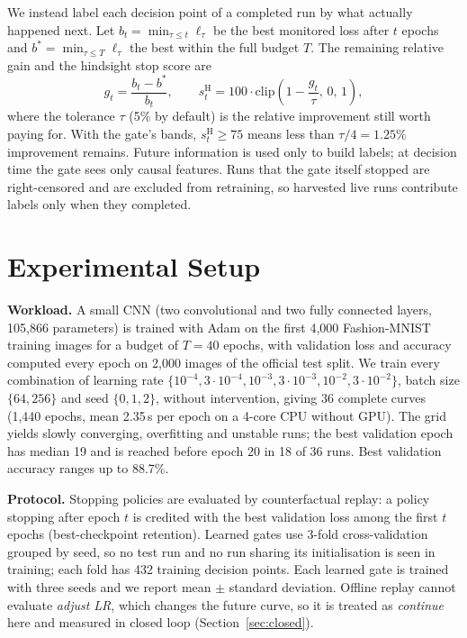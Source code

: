 \documentclass[conference]{IEEEtran}
\begin{document}
We instead label each decision point of a completed run by what actually happened next. Let $b_t=\min_{\tau\le t}\ell_\tau$ be the best monitored loss after $t$ epochs and $b^\ast=\min_{\tau\le T}\ell_\tau$ the best within the full budget $T$. The remaining relative gain and the hindsight stop score are
\begin{equation}
g_t=\frac{b_t-b^\ast}{b_t},\qquad
s^{\mathrm{H}}_t=100\cdot\mathrm{clip}\!\left(1-\frac{g_t}{\tau},\,0,\,1\right),
\end{equation}
where the tolerance $\tau$ (5\% by default) is the relative improvement still worth paying for. With the gate's bands, $s^{\mathrm{H}}_t\ge75$ means less than $\tau/4=1.25\%$ improvement remains. Future information is used only to build labels; at decision time the gate sees only causal features. Runs that the gate itself stopped are right-censored and are excluded from retraining, so harvested live runs contribute labels only when they completed.

\section{Experimental Setup}
\textbf{Workload.} A small CNN (two convolutional and two fully connected layers, 105,866 parameters) is trained with Adam on the first 4,000 Fashion-MNIST~\cite{xiao2017fashion} training images for a budget of $T=40$ epochs, with validation loss and accuracy computed every epoch on 2,000 images of the official test split. We train every combination of learning rate $\{10^{-4},3\cdot10^{-4},10^{-3},3\cdot10^{-3},10^{-2},3\cdot10^{-2}\}$, batch size $\{64,256\}$ and seed $\{0,1,2\}$, without intervention, giving 36 complete curves (1,440 epochs, mean 2.35\,s per epoch on a 4-core CPU without GPU). The grid yields slowly converging, overfitting and unstable runs; the best validation epoch has median 19 and is reached before epoch 20 in 18 of 36 runs. Best validation accuracy ranges up to 88.7\%.

\textbf{Protocol.} Stopping policies are evaluated by counterfactual replay: a policy stopping after epoch $t$ is credited with the best validation loss among the first $t$ epochs (best-checkpoint retention). Learned gates use 3-fold cross-validation grouped by seed, so no test run and no run sharing its initialisation is seen in training; each fold has 432 training decision points. Each learned gate is trained with three seeds and we report mean $\pm$ standard deviation. Offline replay cannot evaluate \emph{adjust LR}, which changes the future curve, so it is treated as \emph{continue} here and measured in closed loop (Section~\ref{sec:closed}).
\end{document}
